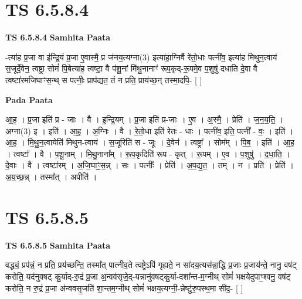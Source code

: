 \documentclass[17pt]{extarticle}
\begin{document}

\section{ TS 6.5.8.4 }

\textbf{TS 6.5.8.4 } \newline
\textbf{Samhita Paata} \newline

-त्या॑ह प्र॒जा वा इ॑न्द्रि॒यं प्र॒जा ए॒वास्मै॒ प्र ज॑नय॒त्यग्ना(3) इत्या॑हा॒ग्निर्वै रे॑तो॒धाः पत्नी॑व॒ इत्या॑ह मिथुन॒त्वाय॑ स॒जूर्दे॒वेन॒ त्वष्ट्रा॒ सोमं॑ पि॒बेत्या॑ह॒ त्वष्टा॒ वै प॑शू॒नां मि॑थु॒नानाꣳ॑ रूप॒कृद्-रू॒पमे॒व प॒शुषु॑ दधाति दे॒वा वै त्वष्टा॑रमजिघाꣳस॒न्थ् स पत्नीः॒ प्राप॑द्यत॒ तं न प्रति॒ प्राय॑च्छ॒न् तस्मा॒दपि॒- [  ] \newline

\textbf{Pada Paata} \newline

आ॒ह॒ । प्र॒जा इति॑ प्र - जाः । वै । इ॒न्द्रि॒यम् । प्र॒जा इति॑ प्र-जाः । ए॒व । अ॒स्मै॒ । प्रेति॑ । ज॒न॒य॒ति॒ । अग्ना(3) इ । इति॑ । आ॒ह॒ । अ॒ग्निः । वै । रे॒तो॒धा इति॑ रेतः - धाः । पत्नी॑व॒ इति॒ पत्नी᳚ - वः॒ । इति॑ । आ॒ह॒ । मि॒थु॒न॒त्वायेति॑ मिथुन-त्वाय॑ । स॒जूरिति॑ स - जूः । दे॒वेन॑ । त्वष्ट्रा᳚ । सोम᳚म् । पि॒ब॒ । इति॑ । आ॒ह॒ । त्वष्टा᳚ । वै । प॒शू॒नाम् । मि॒थु॒नाना᳚म् । रू॒प॒कृदिति॑ रूप - कृत् । रू॒पम् । ए॒व । प॒शुषु॑ । द॒धा॒ति॒ । दे॒वाः । वै । त्वष्टा॑रम् । अ॒जि॒घाꣳ॒॒स॒न्न् । सः । पत्नीः᳚ । प्रेति॑ । अ॒प॒द्य॒त॒ । तम् । न । प्रति॑ । प्रेति॑ । अ॒य॒च्छ॒न्न् । तस्मा᳚त् । अपीति॑ ।  \newline





\section{ TS 6.5.8.5 }

\textbf{TS 6.5.8.5 } \newline
\textbf{Samhita Paata} \newline

वद्ध्यं॒ प्रप॑न्नं॒ न प्रति॒ प्रय॑च्छन्ति॒ तस्मा᳚त् पात्नीव॒ते त्वष्ट्रेऽपि॑ गृह्यते॒ न सा॑दय॒त्यस॑न्ना॒द्धि प्र॒जाः प्र॒जाय॑न्ते॒ नानु॒ वष॑ट् करोति॒ यद॑नुवषट् कु॒र्याद्-रु॒द्रं प्र॒जा अ॒न्वव॑सृजे॒द्-यन्नानु॑वषट्कु॒र्या-दशा᳚न्त-म॒ग्नीथ् सोमं॑ भक्षयेदुपाꣳ॒॒श्वनु॒ वष॑ट् करोति॒ न रु॒द्रं प्र॒जा अ॑न्ववसृ॒जति॑ शा॒न्तम॒ग्नीथ् सोमं॑ भक्षय॒त्यग्नी॒-न्नेष्टु॑रु॒पस्थ॒मा सी॑द॒- [  ] \newline
\end{document}
